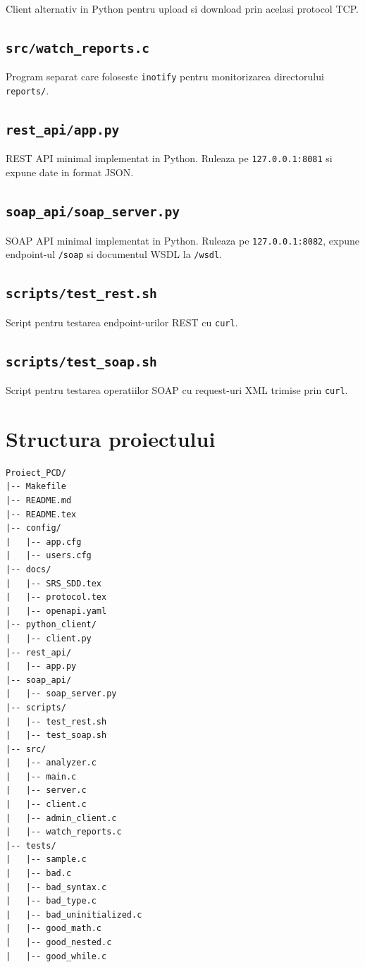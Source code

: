 \documentclass[12pt,a4paper]{article}
\begin{document}
Client alternativ in Python pentru upload si download prin acelasi protocol TCP.

\subsection{\texttt{src/watch\_reports.c}}

Program separat care foloseste \texttt{inotify} pentru monitorizarea directorului \texttt{reports/}.

\subsection{\texttt{rest\_api/app.py}}

REST API minimal implementat in Python. Ruleaza pe \texttt{127.0.0.1:8081} si expune date in format JSON.

\subsection{\texttt{soap\_api/soap\_server.py}}

SOAP API minimal implementat in Python. Ruleaza pe \texttt{127.0.0.1:8082}, expune endpoint-ul \texttt{/soap} si documentul WSDL la \texttt{/wsdl}.

\subsection{\texttt{scripts/test\_rest.sh}}

Script pentru testarea endpoint-urilor REST cu \texttt{curl}.

\subsection{\texttt{scripts/test\_soap.sh}}

Script pentru testarea operatiilor SOAP cu request-uri XML trimise prin \texttt{curl}.

\section{Structura proiectului}

\begin{lstlisting}[style=code]
Proiect_PCD/
|-- Makefile
|-- README.md
|-- README.tex
|-- config/
|   |-- app.cfg
|   |-- users.cfg
|-- docs/
|   |-- SRS_SDD.tex
|   |-- protocol.tex
|   |-- openapi.yaml
|-- python_client/
|   |-- client.py
|-- rest_api/
|   |-- app.py
|-- soap_api/
|   |-- soap_server.py
|-- scripts/
|   |-- test_rest.sh
|   |-- test_soap.sh
|-- src/
|   |-- analyzer.c
|   |-- main.c
|   |-- server.c
|   |-- client.c
|   |-- admin_client.c
|   |-- watch_reports.c
|-- tests/
|   |-- sample.c
|   |-- bad.c
|   |-- bad_syntax.c
|   |-- bad_type.c
|   |-- bad_uninitialized.c
|   |-- good_math.c
|   |-- good_nested.c
|   |-- good_while.c
\end{lstlisting}
\end{document}
